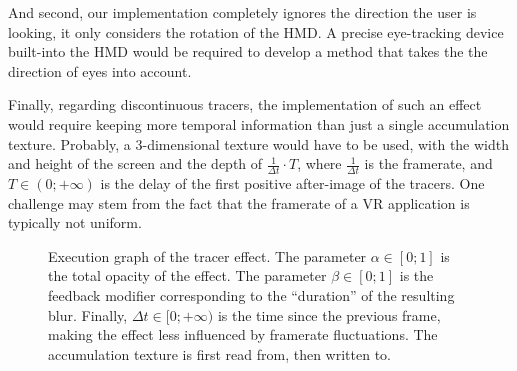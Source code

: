 And second, our implementation completely ignores the direction the user is looking, it only considers the rotation of the \ac{HMD}. A precise eye-tracking device built-into the \ac{HMD} would be required to develop a method that takes the the direction of eyes into account.

Finally, regarding discontinuous tracers, the implementation of such an effect would require keeping more temporal information than just a single accumulation texture. Probably, a 3-dimensional texture would have to be used, with the width and height of the screen and the depth of $\frac{1}{\Delta t} \cdot T$, where $\frac{1}{\Delta t}$ is the framerate, and $T \in (0; +\infty)$ is the delay of the first positive after-image of the tracers. One challenge may stem from the fact that the framerate of a \ac{VR} application is typically not uniform.

\begin{figure}[H]
    \centering
    \ifgraphics

    \fi
    \caption{Execution graph of the tracer effect. The parameter $\alpha \in [0; 1]$ is the total opacity of the effect. The parameter $\beta \in [0; 1]$ is the feedback modifier corresponding to the ``duration'' of the resulting blur. Finally, $\Delta t \in [0; +\infty)$ is the time since the previous frame, making the effect less influenced by framerate fluctuations. The accumulation texture is first read from, then written to.}\label{fig:tracers-graph}
\end{figure}

